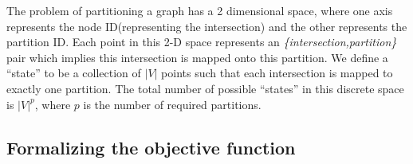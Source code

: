 \noindent The problem of partitioning a graph has a 2 dimensional space, where one axis represents the node ID(representing the intersection) and the other represents the partition ID. Each point in this 2-D space represents an \textit{\{intersection,partition\}} pair which implies this intersection is mapped onto this partition. We define a ``state'' to be a collection of $|V|$ points such that each intersection is mapped to exactly one partition. The total number of possible ``states'' in this discrete space is $|V|^{p}$, where $p$ is the number of required partitions.

\subsection{Formalizing the objective function}
\label{sec:form-obje-func}




